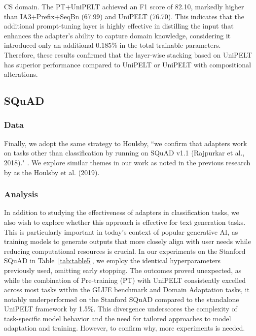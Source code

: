 \documentclass[10pt,twocolumn,letterpaper]{article}
\begin{document}
CS domain. The PT+UniPELT achieved an F1 score of 82.10, markedly higher than IA3+Prefix+SeqBn (67.99) and UniPELT (76.70). This indicates that the additional prompt-tuning layer is highly effective in distilling the  input that enhances the adapter's ability to capture domain knowledge, considering it introduced only an additional 0.185\% in the total trainable parameters. Therefore, these results confirmed that the layer-wise stacking based on UniPELT has superior performance compared to UniPELT or UniPELT with compositional alterations.

\subsection{SQuAD}
\subsubsection{Data}
Finally, we adopt the same strategy to Houlsby, ``we conﬁrm that adapters work on tasks other than classiﬁcation by running on SQuAD v1.1 (Rajpurkar et al., 2018)." \cite{Houlsby2019,DBLP}. We explore similar themes in our work as noted in the previous research by as the Houlsby et al. (2019)\cite{Houlsby2019}. 

\subsubsection{Analysis}
In addition to studying the effectiveness of adapters in classification tasks, we also wish to explore whether this approach is effective for text generation tasks. This is particularly important in today's context of popular generative AI, as training models to generate outputs that more closely align with user needs while reducing computational resources is crucial. In our experiments on the Stanford SQuAD in Table~\ref{tab:table5}, we employ the identical hyperparameters previously used, omitting early stopping. The outcomes proved unexpected, as while the combination of Pre-training (PT) with UniPELT consistently excelled across most tasks within the GLUE benchmark and Domain Adaptation tasks, it notably underperformed on the Stanford SQuAD compared to the standalone UniPELT framework by 1.5\%. This divergence underscores the complexity of task-specific model behavior and the need for tailored approaches to model adaptation and training. However, to confirm why, more experiments is needed.
\end{document}
